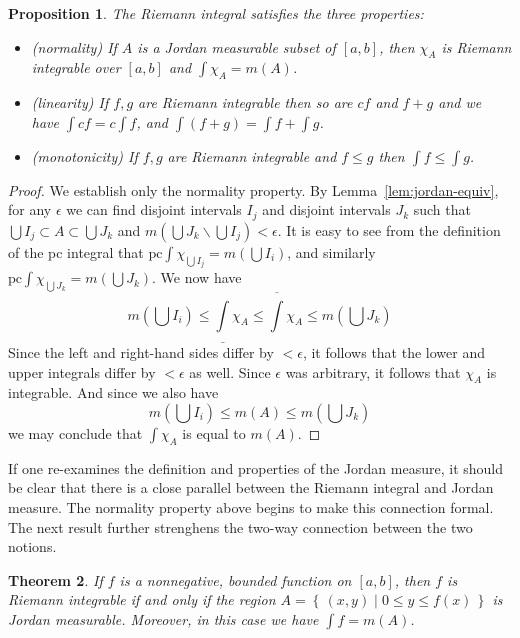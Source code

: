\documentclass[11pt,oneside]{amsbook}
\newcommand{\set}[1]{\left\{\,#1\,\right\}}
\renewcommand{\setminus}{\smallsetminus}
\newcommand{\lint}{\underline\int}
\newcommand{\ovint}{\overline\int}
\theoremstyle{definition}
\theoremstyle{plain}
\newtheorem{thm}{Theorem}[section]
\newtheorem{prop}[thm]{Proposition}
\theoremstyle{definition}
\theoremstyle{remark}
\numberwithin{equation}{section}
\numberwithin{figure}{section}
\begin{document}

\begin{prop}
  \label{prop:riemann-properties}
  The Riemann integral satisfies the three properties:
  \begin{itemize}
  \item (normality) If $A$ is a Jordan measurable subset of $[a,b]$, then $\chi_A$ is Riemann integrable over $[a,b]$ and $\int\chi_A=m(A)$.
  \item (linearity) If $f,g$ are Riemann integrable then so are $cf$ and $f+g$ and we have $\int cf=c\int f$, and $\int(f+g)=\int f+\int g$.
  \item (monotonicity) If $f,g$ are Riemann integrable and $f\leq g$ then $\int f\leq \int g$.
  \end{itemize}
\end{prop}

\begin{proof}
  We establish only the normality property. By Lemma~\ref{lem:jordan-equiv}, for any $\epsilon$ we can find disjoint intervals $I_j$ and disjoint intervals $J_k$ such that $\bigcup I_j\subset A\subset\bigcup J_k$ and $m(\bigcup J_k\setminus\bigcup I_j)<\epsilon$. It is easy to see from the definition of the pc integral that $\text{pc}\int\chi_{\bigcup I_j}=m(\bigcup I_i)$, and similarly $\text{pc}\int\chi_{\bigcup J_k}=m(\bigcup J_k)$. We now have
  \[m(\bigcup I_i)\leq\lint\chi_A\leq\ovint\chi_A
  \leq m(\bigcup J_k)
  \]
  Since the left and right-hand sides differ by $<\epsilon$, it follows that the lower and upper integrals differ by $<\epsilon$ as well. Since $\epsilon$ was arbitrary, it follows that $\chi_A$ is integrable. And since we also have
  \[m(\bigcup I_i)\leq m(A)\leq m(\bigcup J_k)
  \]
  we may conclude that $\int\chi_A$ is equal to $m(A)$.
\end{proof}

If one re-examines the definition and properties of the Jordan measure, it should be clear that there is a close parallel between the Riemann integral and Jordan measure. The normality property above begins to make this connection formal. The next result further strenghens the two-way connection between the two notions.

\begin{thm}
  If $f$ is a nonnegative, bounded function on $[a,b]$, then $f$ is Riemann integrable if and only if the region $A=\set{(x,y)\mid0\leq y\leq f(x)}$ is Jordan measurable. Moreover, in this case we have $\int f=m(A)$.
\end{thm}
\end{document}
